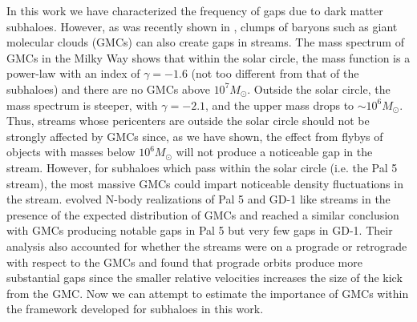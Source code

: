 \documentclass[useAMS,usenatbib]{mn2e}
\begin{document}
In this work we have characterized the frequency of gaps due to dark matter subhaloes. However, as was recently shown in \cite{amorisco_gmcs}, clumps of baryons such as giant molecular clouds (GMCs) can also create gaps in streams. The mass spectrum of GMCs in the Milky Way \citep[e.g.][]{rosolowsky_2005,rice_et_al_2016} shows that within the solar circle, the mass function is a power-law with an index of $\gamma=-1.6$ (not too different from that of the subhaloes) and there are no GMCs above $10^{7} M_\odot$. Outside the solar circle, the mass spectrum is steeper, with $\gamma = -2.1$, and the upper mass drops to $\sim 10^6 M_\odot$. Thus, streams whose pericenters are outside the solar circle should not be strongly affected by GMCs since, as we have shown, the effect from flybys of objects with masses below $10^6 M_\odot$ will not produce a noticeable gap in the stream. However, for subhaloes which pass within the solar circle (i.e. the Pal 5 stream), the most massive GMCs could impart noticeable density fluctuations in the stream. \cite{amorisco_gmcs} evolved N-body realizations of Pal 5 and GD-1 like streams in the presence of the expected distribution of GMCs and reached a similar conclusion with GMCs producing notable gaps in Pal 5 but very few gaps in GD-1. Their analysis also accounted for whether the streams were on a prograde or retrograde with respect to the GMCs and found that prograde orbits produce more substantial gaps since the smaller relative velocities increases the size of the kick from the GMC. Now we can attempt to estimate the importance of GMCs within the framework developed for subhaloes in this work. 
\end{document}
